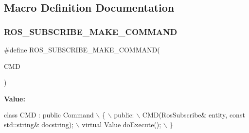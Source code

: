\subsection{Macro Definition Documentation}
\mbox{\label{ros__subscribe_8hh_a9e53bc3e7fd81d7720e099bd9454e57e}} 
\subsubsection{\texorpdfstring{R\+O\+S\+\_\+\+S\+U\+B\+S\+C\+R\+I\+B\+E\+\_\+\+M\+A\+K\+E\+\_\+\+C\+O\+M\+M\+A\+ND}{ROS\_SUBSCRIBE\_MAKE\_COMMAND}}
{\footnotesize\ttfamily \#define R\+O\+S\+\_\+\+S\+U\+B\+S\+C\+R\+I\+B\+E\+\_\+\+M\+A\+K\+E\+\_\+\+C\+O\+M\+M\+A\+ND(\begin{DoxyParamCaption}\item[{}]{C\+MD }\end{DoxyParamCaption})}

{\bfseries Value\+:}
\begin{DoxyCode}
\textcolor{keyword}{class }CMD : \textcolor{keyword}{public} Command                                   \(\backslash\)
    \{                                                            \(\backslash\)
    public:                                                      \(\backslash\)
        CMD(RosSubscribe& entity, \textcolor{keyword}{const} std::string& docstring); \(\backslash\)
        virtual Value doExecute();                               \(\backslash\)
    \}
\end{DoxyCode}
